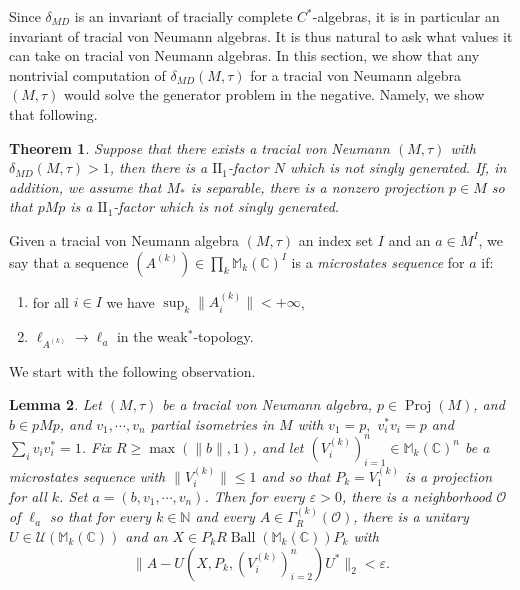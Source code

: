 \documentclass[10pt]{amsart}
\newtheorem{thm}{Theorem}[section]
\newtheorem{lem}[thm]{Lemma}
\theoremstyle{definition}
\numberwithin{equation}{section}
\newcommand{\bC}{{\mathbb C}}
\newcommand{\bM}{{\mathbb M}}
\newcommand{\bN}{{\mathbb N}}
\newcommand{\cU}{{\mathcal U}}
\DeclareMathOperator{\Ball}{Ball}
\DeclareMathOperator{\Proj}{Proj}
\begin{document}
Since $\delta_{MD}$ is an invariant of tracially complete $C^{*}$-algebras, it is in particular an invariant of tracial von Neumann algebras. It is thus natural to ask what values it can take on tracial von Neumann algebras. In this section, we show that any nontrivial computation of $\delta_{MD}(M,\tau)$ for a tracial von Neumann algebra $(M,\tau)$ would solve the generator problem in the negative. Namely, we show that following.

\begin{thm}\label{thm: nontrivial computations for tracial vNas are hard}
Suppose that there exists a tracial von Neumann $(M,\tau)$ with $\delta_{MD}(M,\tau)>1$, then there is a $\textrm{II}_{1}$-factor $N$ which is not singly generated. If, in addition, we assume that $M_{*}$ is separable, there is a nonzero projection $p\in M$ so that $pMp$ is a $\textrm{II}_{1}$-factor which is not singly generated.  
\end{thm}

Given a tracial von Neumann algebra $(M,\tau)$ an index set $I$ and an $a\in M^{I}$, we say that  a sequence $(A^{(k)})\in \prod_{k}\bM_{k}(\bC)^{I}$ is a \emph{microstates sequence} for $a$ if:
\begin{enumerate}
    \item for all $i\in I$ we have $\sup_{k}\|A^{(k)}_{i}\|<+\infty$,
    \item $\ell_{A^{(k)}}\to \ell_{a}$ in the weak$^{*}$-topology.
\end{enumerate}
We start with the following observation.

\begin{lem}\label{lem: small neigbhorhoods concentrate on orbits}
Let $(M,\tau)$ be a tracial von Neumann algebra, $p\in \Proj(M)$, and $b\in pMp$, and $v_{1},\cdots,v_{n}$ partial isometries in $M$ with $v_{1}=p,$ $v_{i}^{*}v_{i}=p$ and $\sum_{i}v_{i}v_{i}^{*}=1$. Fix $R\geq \max(\|b\|,1)$, and let $(V_{i}^{(k)})_{i=1}^{n}\in \bM_{k}(\bC)^{n}$
be a microstates sequence with $\|V_{i}^{(k)}\|\leq 1$ and so that $P_{k}=V_{1}^{(k)}$ is a projection for all $k$. Set $a=(b,v_{1},\cdots,v_{n})$.  Then for every $\varepsilon>0$, there is a neighborhood $\mathcal{O}$ of $\ell_{a}$ so that for every $k\in \bN$ and every $A\in \Gamma^{(k)}_{R}(\mathcal{O})$, there is a unitary $U\in \cU(\bM_{k}(\bC))$ and an $X\in P_{k}R\Ball(\bM_{k}(\bC))P_{k}$ with
\[\|A-U(X,P_{k},(V_{i}^{(k)})_{i=2}^{n})U^{*}\|_{2}<\varepsilon.\]
\end{lem}
\end{document}
